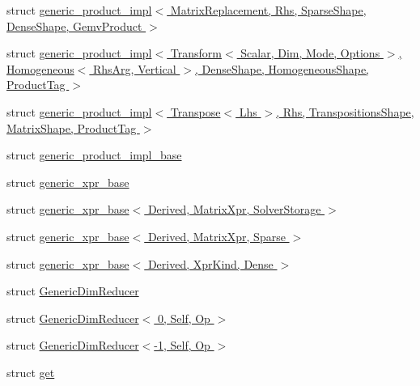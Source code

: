 \begin{DoxyCompactItemize}
\item 
struct \hyperlink{struct_eigen_1_1internal_1_1generic__product__impl_3_01_matrix_replacement_00_01_rhs_00_01_spars44a334490feb2d22de510ceb99173cfe}{generic\+\_\+product\+\_\+impl$<$ Matrix\+Replacement, Rhs, Sparse\+Shape, Dense\+Shape, Gemv\+Product $>$}
\item 
struct \hyperlink{struct_eigen_1_1internal_1_1generic__product__impl_3_01_transform_3_01_scalar_00_01_dim_00_01_mo9dee7991850e2cedf8646fca36129af2}{generic\+\_\+product\+\_\+impl$<$ Transform$<$ Scalar, Dim, Mode, Options $>$, Homogeneous$<$ Rhs\+Arg, Vertical $>$, Dense\+Shape, Homogeneous\+Shape, Product\+Tag $>$}
\item 
struct \hyperlink{struct_eigen_1_1internal_1_1generic__product__impl_3_01_transpose_3_01_lhs_01_4_00_01_rhs_00_01_287c8e613c7656c0ce6593799fd7b329}{generic\+\_\+product\+\_\+impl$<$ Transpose$<$ Lhs $>$, Rhs, Transpositions\+Shape, Matrix\+Shape, Product\+Tag $>$}
\item 
struct \hyperlink{struct_eigen_1_1internal_1_1generic__product__impl__base}{generic\+\_\+product\+\_\+impl\+\_\+base}
\item 
struct \hyperlink{struct_eigen_1_1internal_1_1generic__xpr__base}{generic\+\_\+xpr\+\_\+base}
\item 
struct \hyperlink{struct_eigen_1_1internal_1_1generic__xpr__base_3_01_derived_00_01_matrix_xpr_00_01_solver_storage_01_4}{generic\+\_\+xpr\+\_\+base$<$ Derived, Matrix\+Xpr, Solver\+Storage $>$}
\item 
struct \hyperlink{struct_eigen_1_1internal_1_1generic__xpr__base_3_01_derived_00_01_matrix_xpr_00_01_sparse_01_4}{generic\+\_\+xpr\+\_\+base$<$ Derived, Matrix\+Xpr, Sparse $>$}
\item 
struct \hyperlink{struct_eigen_1_1internal_1_1generic__xpr__base_3_01_derived_00_01_xpr_kind_00_01_dense_01_4}{generic\+\_\+xpr\+\_\+base$<$ Derived, Xpr\+Kind, Dense $>$}
\item 
struct \hyperlink{struct_eigen_1_1internal_1_1_generic_dim_reducer}{Generic\+Dim\+Reducer}
\item 
struct \hyperlink{struct_eigen_1_1internal_1_1_generic_dim_reducer_3_010_00_01_self_00_01_op_01_4}{Generic\+Dim\+Reducer$<$ 0, Self, Op $>$}
\item 
struct \hyperlink{struct_eigen_1_1internal_1_1_generic_dim_reducer_3-1_00_01_self_00_01_op_01_4}{Generic\+Dim\+Reducer$<$-\/1, Self, Op $>$}
\item 
struct \hyperlink{struct_eigen_1_1internal_1_1get}{get}
\item 

\end{DoxyCompactItemize}

